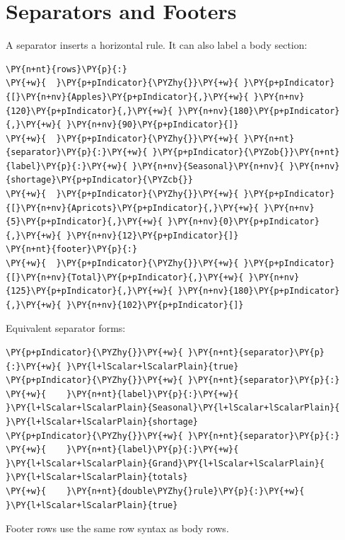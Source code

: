 \documentclass[a4paper,twoside]{article}
\begin{document}
\section{Separators and Footers}
A separator inserts a horizontal rule. It can also label a body section:
\begin{tscode}[lang=yaml, engine=pygments]
\begin{Verbatim}[commandchars=\\\{\},breaklines, breakanywhere, commandchars=\\\{\}]
\PY{n+nt}{rows}\PY{p}{:}
\PY{+w}{  }\PY{p+pIndicator}{\PYZhy{}}\PY{+w}{ }\PY{p+pIndicator}{[}\PY{n+nv}{Apples}\PY{p+pIndicator}{,}\PY{+w}{ }\PY{n+nv}{120}\PY{p+pIndicator}{,}\PY{+w}{ }\PY{n+nv}{180}\PY{p+pIndicator}{,}\PY{+w}{ }\PY{n+nv}{90}\PY{p+pIndicator}{]}
\PY{+w}{  }\PY{p+pIndicator}{\PYZhy{}}\PY{+w}{ }\PY{n+nt}{separator}\PY{p}{:}\PY{+w}{ }\PY{p+pIndicator}{\PYZob{}}\PY{n+nt}{label}\PY{p}{:}\PY{+w}{ }\PY{n+nv}{Seasonal}\PY{n+nv}{ }\PY{n+nv}{shortage}\PY{p+pIndicator}{\PYZcb{}}
\PY{+w}{  }\PY{p+pIndicator}{\PYZhy{}}\PY{+w}{ }\PY{p+pIndicator}{[}\PY{n+nv}{Apricots}\PY{p+pIndicator}{,}\PY{+w}{ }\PY{n+nv}{5}\PY{p+pIndicator}{,}\PY{+w}{ }\PY{n+nv}{0}\PY{p+pIndicator}{,}\PY{+w}{ }\PY{n+nv}{12}\PY{p+pIndicator}{]}
\PY{n+nt}{footer}\PY{p}{:}
\PY{+w}{  }\PY{p+pIndicator}{\PYZhy{}}\PY{+w}{ }\PY{p+pIndicator}{[}\PY{n+nv}{Total}\PY{p+pIndicator}{,}\PY{+w}{ }\PY{n+nv}{125}\PY{p+pIndicator}{,}\PY{+w}{ }\PY{n+nv}{180}\PY{p+pIndicator}{,}\PY{+w}{ }\PY{n+nv}{102}\PY{p+pIndicator}{]}
\end{Verbatim}
\end{tscode}
Equivalent separator forms:
\begin{tscode}[lang=yaml, engine=pygments]
\begin{Verbatim}[commandchars=\\\{\},breaklines, breakanywhere, commandchars=\\\{\}]
\PY{p+pIndicator}{\PYZhy{}}\PY{+w}{ }\PY{n+nt}{separator}\PY{p}{:}\PY{+w}{ }\PY{l+lScalar+lScalarPlain}{true}
\PY{p+pIndicator}{\PYZhy{}}\PY{+w}{ }\PY{n+nt}{separator}\PY{p}{:}
\PY{+w}{    }\PY{n+nt}{label}\PY{p}{:}\PY{+w}{ }\PY{l+lScalar+lScalarPlain}{Seasonal}\PY{l+lScalar+lScalarPlain}{ }\PY{l+lScalar+lScalarPlain}{shortage}
\PY{p+pIndicator}{\PYZhy{}}\PY{+w}{ }\PY{n+nt}{separator}\PY{p}{:}
\PY{+w}{    }\PY{n+nt}{label}\PY{p}{:}\PY{+w}{ }\PY{l+lScalar+lScalarPlain}{Grand}\PY{l+lScalar+lScalarPlain}{ }\PY{l+lScalar+lScalarPlain}{totals}
\PY{+w}{    }\PY{n+nt}{double\PYZhy{}rule}\PY{p}{:}\PY{+w}{ }\PY{l+lScalar+lScalarPlain}{true}
\end{Verbatim}
\end{tscode}
Footer rows use the same row syntax as body rows.
\end{document}
